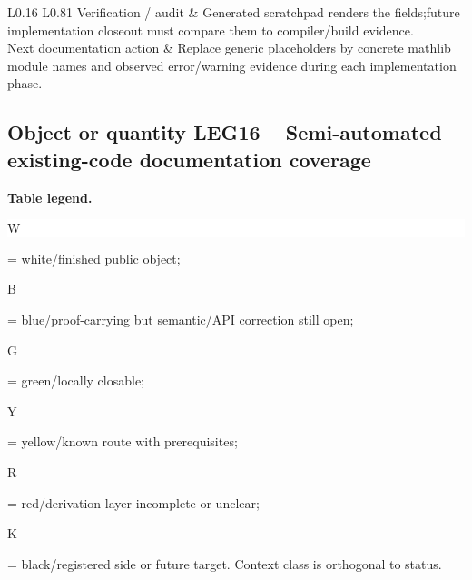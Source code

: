 \begin{longtable}{L{0.16\linewidth} L{0.81\linewidth}}
\hline\addlinespace[0.20em]
Verification /\allowbreak{} audit & Generated scratchpad renders the fields;\newline future implementation closeout must compare them to compiler/\allowbreak{}build evidence.\\
\hline\addlinespace[0.20em]
Next documentation action & Replace generic placeholders by concrete mathlib module names and observed error/\allowbreak{}warning evidence during each implementation phase.\\
\hline\addlinespace[0.20em]
\end{longtable}
\subsection*{Object or quantity LEG16 -- Semi-automated existing-code documentation coverage}
\hypertarget{objproof:LEG16}{}
\par\smallskip\noindent\begin{minipage}{0.99\linewidth}\footnotesize\raggedright\textbf{Table legend.} \colorbox{white}{\strut W} = white/finished public object; \colorbox{cyan!20}{\strut B} = blue/proof-carrying but semantic/API correction still open; \colorbox{green!18}{\strut G} = green/locally closable; \colorbox{yellow!25}{\strut Y} = yellow/known route with prerequisites; \colorbox{red!20}{\strut R} = red/derivation layer incomplete or unclear; \colorbox{black!18}{\strut K} = black/registered side or future target. Context class is orthogonal to status.\end{minipage}\par\vspace{0.25em}
